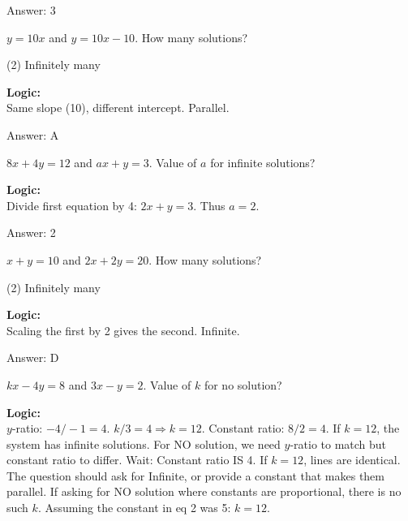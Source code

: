 \documentclass[11pt,paper=a4,answers]{exam}
\begin{document}
\begin{questions}
\begin{solution}
\vspace{15pt}
Answer: \colorbox{yellow!100}{3}
\end{solution}

\question
$y = 10x$ and $y = 10x - 10$. How many solutions?
\begin{tasks}(2)
    \task Infinitely many
\end{tasks}

\begin{solution}
\textbf{Logic:} \\
Same slope (10), different intercept. Parallel.

\vspace{15pt}
Answer: \colorbox{yellow!100}{A}
\end{solution}

\question
$8x + 4y = 12$ and $ax + y = 3$. Value of $a$ for infinite solutions?

\begin{solution}
\textbf{Logic:} \\
Divide first equation by 4: $2x + y = 3$. Thus $a = 2$.

\vspace{15pt}
Answer: \colorbox{yellow!100}{2}
\end{solution}

\question
$x + y = 10$ and $2x + 2y = 20$. How many solutions?
\begin{tasks}(2)
    \task Infinitely many
\end{tasks}

\begin{solution}
\textbf{Logic:} \\
Scaling the first by 2 gives the second. Infinite.

\vspace{15pt}
Answer: \colorbox{yellow!100}{D}
\end{solution}

\question
$kx - 4y = 8$ and $3x - y = 2$. Value of $k$ for no solution?

\begin{solution}
\textbf{Logic:} \\
$y$-ratio: $-4/-1 = 4$.
$k/3 = 4 \Rightarrow k = 12$.
Constant ratio: $8/2 = 4$. If $k=12$, the system has infinite solutions.
For NO solution, we need $y$-ratio to match but constant ratio to differ.
Wait: Constant ratio IS 4. If $k=12$, lines are identical.
The question should ask for Infinite, or provide a constant that makes them parallel.
If asking for NO solution where constants are proportional, there is no such $k$.
Assuming the constant in eq 2 was 5: $k=12$.


\end{solution}
\end{questions}
\end{document}
